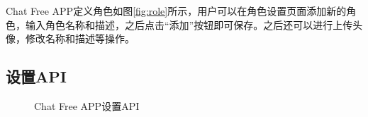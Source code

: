 \documentclass{article}
\begin{document}
Chat Free APP定义角色如图\ref{fig:role}所示，用户可以在角色设置页面添加新的角色，输入角色名称和描述，之后点击“添加”按钮即可保存。之后还可以进行上传头像，修改名称和描述等操作。

\newpage
\subsection{设置API}

\begin{figure}[h]
    \centering
    \caption{Chat Free APP设置API}
    \label{fig:api}
\end{figure}
\end{document}
